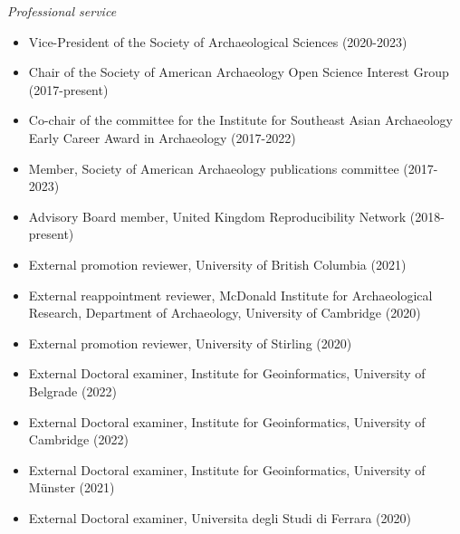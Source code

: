 \medskip

\noindent\emph{Professional service\vspace{0.01in}}

\medskip

\begin{itemize}[noitemsep, font=$\bullet$\scshape\bfseries]

\item Vice-President of the Society of Archaeological Sciences (2020-2023)

\item Chair of the Society of American Archaeology Open Science Interest Group (2017-present)

\item Co-chair of the committee for the Institute for Southeast Asian Archaeology Early Career Award in Archaeology (2017-2022)

\item Member, Society of American Archaeology publications committee (2017-2023)

\item Advisory Board member, United Kingdom Reproducibility Network (2018-present)

\item External promotion reviewer, University of British Columbia (2021)

\item External reappointment reviewer, McDonald Institute for Archaeological Research, Department of Archaeology, University of Cambridge (2020)

\item External promotion reviewer, University of Stirling (2020)

\item External Doctoral examiner, Institute for Geoinformatics, University of Belgrade (2022)

\item External Doctoral examiner, Institute for Geoinformatics, University of Cambridge (2022)

\item External Doctoral examiner, Institute for Geoinformatics, University of Münster (2021)

\item External Doctoral examiner, Universita degli Studi di Ferrara (2020)

\end{itemize}

\medskip

